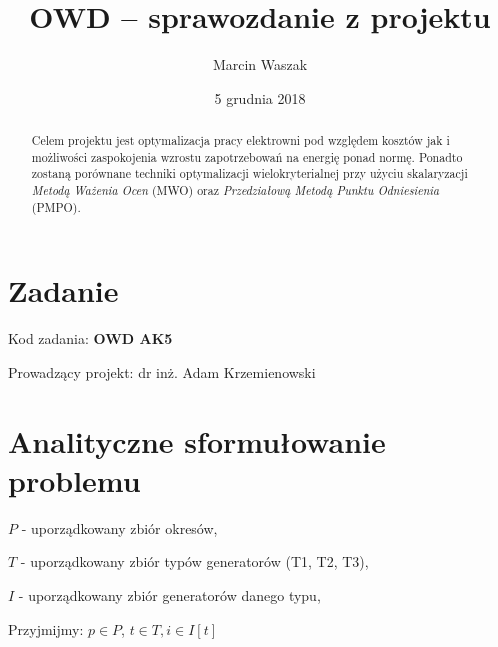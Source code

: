 \documentclass[12pt, twoside, hidelinks, a4paper]{article}
\begin{document}

\author{Marcin Waszak}
\title{OWD -- sprawozdanie z projektu}
\date{5 grudnia 2018}


\maketitle

\begin{abstract}
Celem projektu jest optymalizacja pracy elektrowni pod względem kosztów jak i możliwości zaspokojenia wzrostu zapotrzebowań na energię ponad normę. Ponadto zostaną porównane techniki optymalizacji wielokryterialnej przy użyciu skalaryzacji \textit{Metodą Ważenia Ocen} (MWO) oraz \textit{Przedziałową Metodą Punktu Odniesienia} (PMPO).
\end{abstract}

\section{Zadanie}
Kod zadania: \textbf{OWD AK5}

Prowadzący projekt: dr inż. Adam Krzemienowski

\section{Analityczne sformułowanie problemu}
$P$ - uporządkowany zbiór okresów,

$T$ - uporządkowany zbiór typów generatorów (T1, T2, T3),

$I$ - uporządkowany zbiór generatorów danego typu,

Przyjmijmy: $p \in P$, $t \in T, i \in I[t]$
\end{document}
